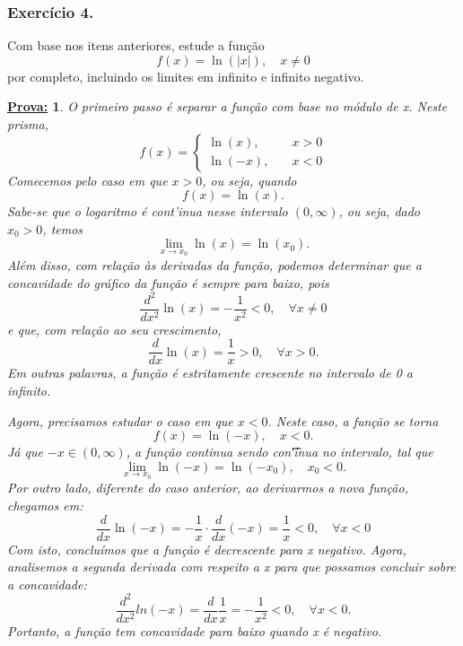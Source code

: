 \documentclass{article}
\newtheorem*{proof*}{\underline{Prova:}}
\begin{document}
\subsubsection{Exerc\'icio 4.}
Com base nos itens anteriores, estude a fun\c c\~ao
\[
	f(x) = \ln(|x|), \quad x\neq{0}
\]
por completo, incluindo os limites em infinito e infinito negativo.

\begin{proof*}
	O primeiro passo \'e separar a fun\c c\~ao com base no m\'odulo de x. Neste
	prisma,
	\[
		f(x) = \left\{
		\begin{array}{ll}
			\ln(x), \quad  & x > 0 \\
			\ln(-x), \quad & x < 0
		\end{array}\right.
	\]
	Comecemos pelo caso em que $x > 0$, ou seja, quando
	\[
		f(x) = \ln(x).
	\]
	Sabe-se que o logaritmo \'e cont'inua nesse intervalo $(0, \infty)$, ou seja,
	dado $x_{0}> 0$, temos
	\[
		\lim_{x\to{x_0}}\ln(x) = \ln(x_{0}).
	\]
	Al\'em disso, com rela\c c\~ao \`as derivadas da fun\c c\~ao, podemos
	determinar que a concavidade do gr\'afico da fun\c c\~ao \'e sempre para baixo,
	pois
	\[
		\frac{d^{2}}{dx^{2}}\ln(x) = -\frac{1}{x^{2}}< 0, \quad \forall x\neq0
	\]
	e que, com rela\c c\~ao ao seu crescimento,
	\[
		\frac{d}{dx}\ln(x) = \frac{1}{x}> 0, \quad \forall x > 0.
	\]
	Em outras palavras, a fun\c c\~ao \'e estritamente crescente no intervalo de 0
	a infinito.

	Agora, precisamos estudar o caso em que $x < 0$. Neste caso, a fun\c c\~ao se torna
	\[
		f(x) = \ln(-x),\quad x < 0.
	\]
	J\'a que $-x\in(0, \infty)$, a fun\c c\~ao continua sendo con\t'inua no
	intervalo, tal que
	\[
		\lim_{x\to{x_0}}\ln(-x) = \ln(-x_{0}), \quad x_{0}< 0.
	\]
	Por outro lado, diferente do caso anterior, ao derivarmos a nova fun\c c\~ao, chegamos
	em:
	\[
		\frac{d}{dx}\ln(-x) = -\frac{1}{x}\cdot\frac{d}{dx}(-x) = \frac{1}{x}< 0, \quad \forall x < 0
	\]
	Com isto, conclu\'imos que a fun\c c\~ao \'e decrescente para x negativo.
	Agora, analisemos a segunda derivada com respeito a x para que possamos concluir
	sobre a concavidade:
	\[
		\frac{d^{2}}{d x^{2}}ln(-x) = \frac{d}{dx}\frac{1}{x}= -\frac{1}{x^{2}}< 0, \quad \forall x < 0.
	\]
	Portanto, a fun\c c\~ao tem concavidade para baixo quando x \'e negativo.


\end{proof*}
\end{document}
